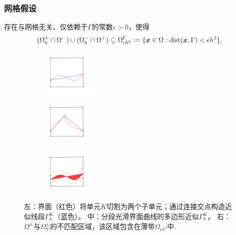 \documentclass[notheorems,serif]{beamer}
\begin{document}
\begin{frame}
\frametitle{网格假设}
\begin{assumption}[薄带假设]
\label{interf_eps}
存在与网格无关、仅依赖于$\Gamma$的常数$\epsilon>0$，使得
\begin{equation}
\label{interf_eps_eq}
(\Omega^+_h\cap \Omega^-)\cup (\Omega^-_h\cap \Omega^+) \subseteq
\Omega^{\Gamma}_{\epsilon h^2} := \{\boldsymbol{x} \in \Omega : \mathrm{dist}(\boldsymbol{x}, \Gamma) <
\epsilon h^2\},
\end{equation}
\end{assumption}

\begin{figure}[h]
\centering
\begin{subfigure}{.3\textwidth}
    \includegraphics[width=1.05in]{../figures/maxwell/interfelem1}
\label{fig:interfelem1}
\end{subfigure}
\begin{subfigure}{.3\textwidth}
    \includegraphics[width=1.05in]{../figures/maxwell/interfelem3}
\label{fig:interfelem2}
\end{subfigure}
\begin{subfigure}{.3\textwidth}
    \includegraphics[width=1.05in]{../figures/maxwell/interfelem2}
\label{fig:interfelem3}
\end{subfigure}
\caption{左：界面（红色）将单元$K$切割为两个子单元；通过连接交点构造近似线段$\Gamma^K_h$（蓝色）。
中：分段光滑界面曲线的多边形近似$\Gamma^K_h$。
右：$\Omega^{\pm}$与$\Omega^{\pm}_h$的不匹配区域，该区域包含在薄带$\Omega_{\epsilon
h^2}$中.}
\label{fig:interfelem}
\end{figure}

\end{frame}
\end{document}
